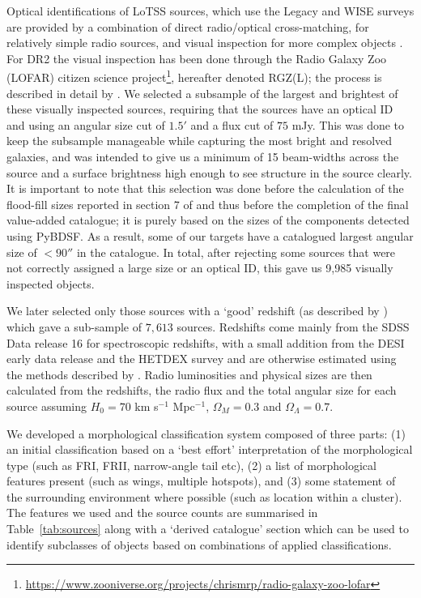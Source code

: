 \documentclass{aa}
\begin{document}
Optical identifications of LoTSS sources, which use the Legacy and WISE surveys \citep{dey19,meisner18} are provided by a combination of direct radio/optical cross-matching, for relatively simple radio sources, and visual inspection for more complex objects \citep{williams19}. For DR2 the visual inspection has been done through the Radio Galaxy Zoo (LOFAR) citizen science project\footnote{\url{https://www.zooniverse.org/projects/chrismrp/radio-galaxy-zoo-lofar}}, hereafter denoted RGZ(L); the process is described in detail by \cite{hardcastle23}. We selected a subsample of the largest and brightest of these visually inspected sources, requiring that the sources have an optical ID and using an angular size cut of $1.5'$ and a flux cut of $75$ mJy. This was done to keep the subsample manageable while capturing the most bright and resolved galaxies, and was intended to give us a minimum of 15 beam-widths across the source and a surface brightness high enough to see structure in the source clearly. It is important to note that this selection was done before the calculation of the flood-fill sizes reported in section 7 of \cite{hardcastle23} and thus before the completion of the final value-added catalogue; it is purely based on the sizes of the components detected using PyBDSF. As a result, some of our targets have a catalogued largest angular size of $<90''$ in the \cite{hardcastle23} catalogue. In total, after rejecting some sources that were not correctly assigned a large size or an optical ID, this gave us 9,985 visually inspected objects.

We later selected only those sources with a `good' redshift (as described by \citealt{hardcastle23}) which gave a sub-sample of $7,613$ sources. Redshifts come mainly from the SDSS Data release 16 \citep{blanton17} for spectroscopic redshifts, with a small addition from the DESI early data release \citep{juneau22} and the HETDEX survey \citep{mentuchcooper23} and are otherwise estimated using the methods described by \cite{duncan21}. Radio luminosities and physical sizes are then calculated from the redshifts, the radio flux and the total angular size for each source assuming $H_0 = 70$ km s$^{-1}$ Mpc$^{-1}$, $\Omega_M = 0.3$ and $\Omega_\Lambda = 0.7$.  

We developed a morphological classification system composed of three parts: (1) an initial classification based on a `best effort' interpretation of the morphological type (such as FRI, FRII, narrow-angle tail etc), (2) a list of morphological features present (such as wings, multiple hotspots), and (3) some statement of the surrounding environment where possible (such as location within a cluster). The features we used and the source counts are summarised in Table~\ref{tab:sources} along with a `derived catalogue' section which can be used to identify subclasses of objects based on combinations of applied classifications.
\end{document}
